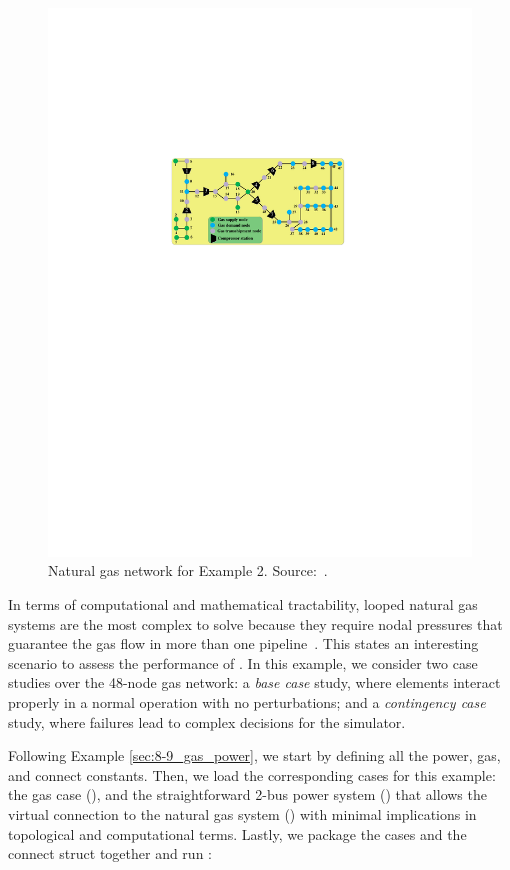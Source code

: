 \begin{figure}[H]
\centering
\includegraphics[scale=1.6]{Figures/NG48}
\caption{Natural gas network for Example 2. Source:~\cite{Chen2017}.}
\label{fig:ng48}
\end{figure}

In terms of computational and mathematical tractability, looped natural gas systems are the most complex to solve because they require nodal pressures that guarantee the gas flow in more than one pipeline~\cite{Woldeyohannes2011}. This states an interesting scenario to assess the performance of \mpng{}. In this example, we consider two case studies over the 48-node gas network: a \textit{base case} study, where elements interact properly in a normal operation with no perturbations; and a \textit{contingency case} study, where failures lead to complex decisions for the simulator.

Following Example \ref{sec:8-9_gas_power}, we start by defining all the power, gas, and connect constants. Then, we load the corresponding cases for this example: the gas case (), and the straightforward 2-bus power system () that allows the virtual connection to the natural gas system () with minimal implications in topological and computational terms. Lastly, we package the cases and the connect struct together and  run \mpng{}:

